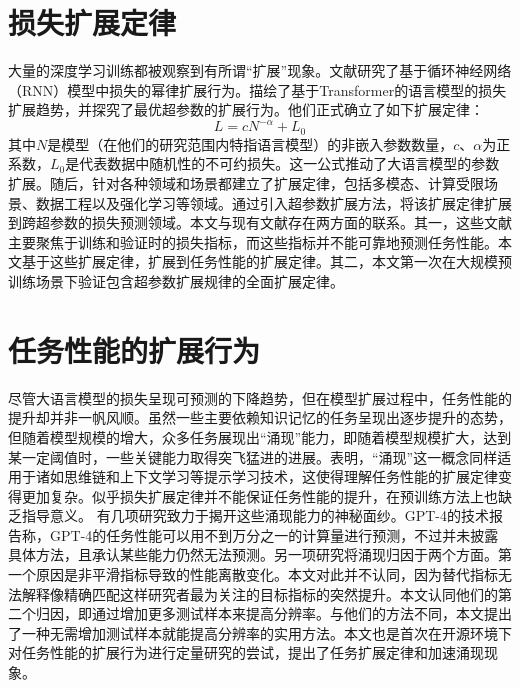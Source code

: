 \section{损失扩展定律}
大量的深度学习训练都被观察到有所谓“扩展”现象\citep{hestness2017deep, kaplan2020scaling, rae2021scaling, aghajanyan2023scaling}。文献\citet{hestness2017deep}研究了基于循环神经网络（RNN）模型中损失的幂律扩展行为。\citet{kaplan2020scaling}描绘了基于Transformer的语言模型的损失扩展趋势，并探究了最优超参数的扩展行为。他们正式确立了如下扩展定律：
\begin{equation}
\label{eq:loss_scaling_law}
    L = c N^{-\alpha} + L_0
\end{equation}
其中\(N\)是模型（在他们的研究范围内特指语言模型）的非嵌入参数数量，\(c\)、\(\alpha\)为正系数，\(L_0\)是代表数据中随机性的不可约损失。这一公式推动了大语言模型的参数扩展。随后，针对各种领域和场景都建立了扩展定律，包括多模态\citep{henighan2020scaling, zhai2022scaling}、计算受限场景\citep{hoffmann2022training}、数据工程\citep{muennighoff2023scaling,sorscher2022beyond}以及强化学习\citep{gao2023scaling}等领域。\citet{yao2023research}通过引入超参数扩展方法，将该扩展定律扩展到跨超参数的损失预测领域。本文与现有文献存在两方面的联系。其一，这些文献主要聚焦于训练和验证时的损失指标，而这些指标并不能可靠地预测任务性能。本文基于这些扩展定律，扩展到任务性能的扩展定律。其二，本文第一次在大规模预训练场景下验证包含超参数扩展规律的全面扩展定律。


\section{任务性能的扩展行为}

尽管大语言模型的损失呈现可预测的下降趋势，但在模型扩展过程中，任务性能的提升却并非一帆风顺。虽然一些主要依赖知识记忆的任务呈现出逐步提升的态势，但随着模型规模的增大，众多任务展现出“涌现”能力\citep{srivastava2022beyond,wei2022emergent}，即随着模型规模扩大，达到某一定阈值时，一些关键能力取得突飞猛进的进展。\citet{wei2022emergent}表明，“涌现”这一概念同样适用于诸如思维链\citep{wei2022chain}和上下文学习\citep{brown2020language}等提示学习技术，这使得理解任务性能的扩展定律变得更加复杂。似乎损失扩展定律并不能保证任务性能的提升，在预训练方法上也缺乏指导意义。
有几项研究致力于揭开这些涌现能力的神秘面纱。GPT-4的技术报告\citep{openai2023gpt4}称，GPT-4的任务性能可以用不到万分之一的计算量进行预测，不过并未披露具体方法，且承认某些能力仍然无法预测。另一项研究\citep{schaeffer2023emergent}将涌现归因于两个方面。第一个原因是非平滑指标导致的性能离散变化。本文对此并不认同，因为替代指标无法解释像精确匹配这样研究者最为关注的目标指标的突然提升。本文认同他们的第二个归因，即通过增加更多测试样本来提高分辨率。与他们的方法不同，本文提出了一种无需增加测试样本就能提高分辨率的实用方法。本文也是首次在开源环境下对任务性能的扩展行为进行定量研究的尝试，提出了任务扩展定律和加速涌现现象。 

